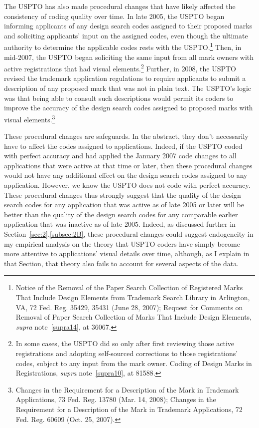\documentclass[letterpaper, 11pt, oneside]{article}
\begin{document}
\begin{enumerate}
The USPTO has also made procedural changes that have likely affected the consistency of coding quality over time. In late 2005, the USPTO began informing applicants of any design search codes assigned to their proposed marks and soliciting applicants' input on the assigned codes, even though the ultimate authority to determine the applicable codes rests with the USPTO.\footnote{\label{supra27} Notice of the Removal of the Paper Search Collection of Registered Marks That Include Design Elements from Trademark Search Library in Arlington, VA, 72 Fed. Reg. 35429, 35431 (June 28, 2007); Request for Comments on Removal of Paper Search Collection of Marks That Include Design Elements, \textit{supra} note~\ref{supra14}, at 36067.} Then, in mid-2007, the USPTO began soliciting the same input from all mark owners with active registrations that had visual elements.\footnote{In some cases, the USPTO did so only after first reviewing those active registrations and adopting self-sourced corrections to those registrations' codes, subject to any input from the mark owner. Coding of Design Marks in Registrations, \textit{supra} note~\ref{supra10}, at 81588.} Further, in 2008, the USPTO revised the trademark application regulations to require applicants to submit a description of any proposed mark that was not in plain text. The USPTO's logic was that being able to consult such descriptions would permit its coders to improve the accuracy of the design search codes assigned to proposed marks with visual elements.\footnote{Changes in the Requirement for a Description of the Mark in Trademark Applications, 73 Fed. Reg. 13780 (Mar. 14, 2008); Changes in the Requirement for a Description of the Mark in Trademark Applications, 72 Fed. Reg. 60609 (Oct. 25, 2007).}

These procedural changes are safeguards. In the abstract, they don't necessarily have to affect the codes assigned to applications. Indeed, if the USPTO coded with perfect accuracy and had applied the January 2007 code changes to all applications that were active at that time or later, then these procedural changes would not have any additional effect on the design search codes assigned to any application. However, we know the USPTO does not code with perfect accuracy. These procedural changes thus strongly suggest that the quality of the design search codes for any application that was active as of late 2005 or later will be better than the quality of the design search codes for any comparable earlier application that was inactive as of late 2005. Indeed, as discussed further in Section~\ref{sec:2}.\ref{subsec:2B}, these procedural changes could suggest endogeneity in my empirical analysis on the theory that USPTO coders have simply become more attentive to applications' visual details over time, although, as I explain in that Section, that theory also fails to account for several aspects of the data.

\end{enumerate}
\end{document}
